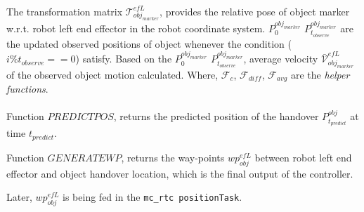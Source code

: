 \documentclass[]{article}
\begin{document}
\paragraph*{}
The transformation matrix $\mathcal{T}^{efL}_{obj_{marker}}$, provides the relative pose of object marker w.r.t. robot left end effector in the robot coordinate system. $P^{obj_{marker}}_0$ $P^{obj_{marker}}_{t_{observe}}$ are the updated observed positions of object whenever the condition ($i\%t_{observe}==0$) satisfy. Based on the  $P^{obj_{marker}}_0$ $P^{obj_{marker}}_{t_{observe}}$, average velocity $\mathcal{\bar{V}}^{efL}_{obj_{marker}}$ of the observed object motion calculated. Where, $\mathcal{F}_c$, $\mathcal{F}_{diff}$, $\mathcal{F}_{avg}$ are the \textit{helper functions}.

\paragraph*{}
Function $PREDICTPOS$, returns the predicted position of the handover $P^{obj}_{t_{predict}}$ at time $t_{predict}$.

Function $GENERATEWP$, returns the way-points $wp^{efL}_{obj}$ between robot left end effector and object handover location, which is the final output of the controller. 

Later, $wp^{efL}_{obj}$ is being fed in the \texttt{mc\_rtc positionTask}.
\end{document}
